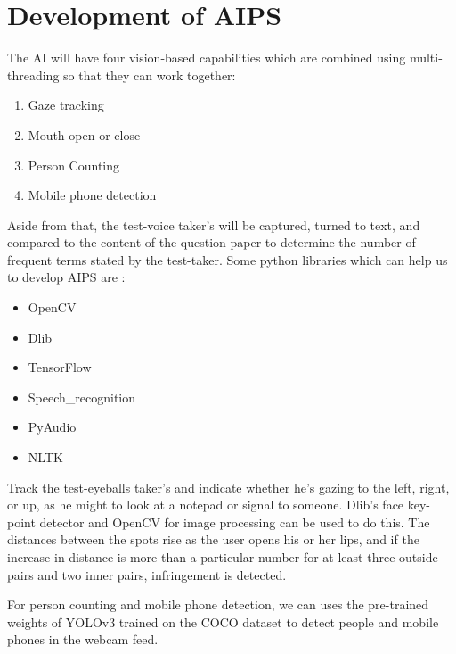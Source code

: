 \documentclass[10pt,a4paper,twoside]{article}
\begin{document}
\section{Development of AIPS}
\item
The AI will have four vision-based capabilities which are combined using multi-threading so that they can work together:
\begin{enumerate}
\item     Gaze tracking
\item     Mouth open or close
\item     Person Counting
\item     Mobile phone detection
\end{enumerate}
Aside from that, the test-voice taker's will be captured, turned to text, and compared to the content of the question paper to determine the number of frequent terms stated by the test-taker. Some python libraries which can help us to develop AIPS are :
\begin{itemize}
\item OpenCV
\item Dlib
\item TensorFlow
\item Speech\_recognition
\item PyAudio
\item NLTK
\end{itemize}
\item
Track the test-eyeballs taker's and indicate whether he's gazing to the left, right, or up, as he might to look at a notepad or signal to someone. Dlib's face key-point detector and OpenCV for image processing can be used to do this. The distances between the spots rise as the user opens his or her lips, and if the increase in distance is more than a particular number for at least three outside pairs and two inner pairs, infringement is detected.
\item
For person counting and mobile phone detection, we can uses the pre-trained weights of YOLOv3 trained on the COCO dataset to detect people and mobile phones in the webcam feed.
\end{document}

